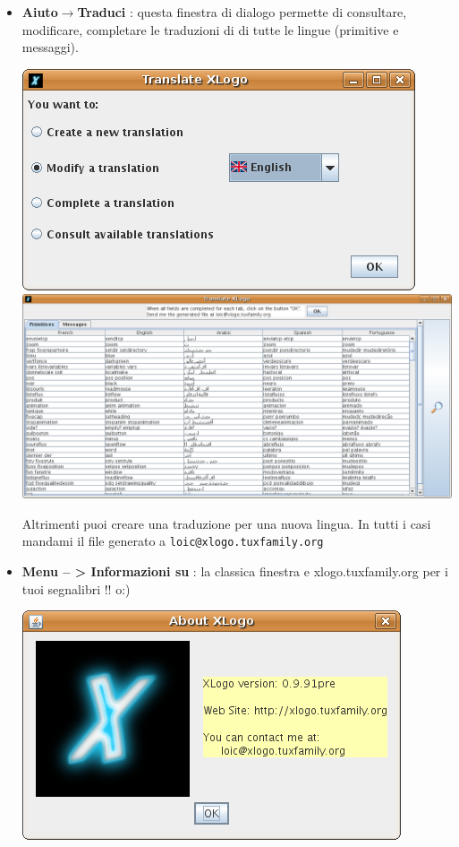 \begin{itemize}
		\item \textbf{Aiuto$\to$Traduci \xlogo}: questa finestra di dialogo permette di consultare, modificare, completare le traduzioni di \xlogo di tutte le lingue (primitive e messaggi).
		\begin{center}
			\includegraphics[scale=0.4]{pics/interface-CaptureXLogoTranslate1.png}
			\includegraphics[scale=0.4]{pics/interface-CaptureXLogoTranslate2.png}
		\end{center}
		\vspace{0.25cm}
		Altrimenti puoi creare una traduzione per una nuova lingua. In tutti i casi mandami il file generato a \texttt{loic@xlogo.tuxfamily.org}
		\item \textbf{Menu -- > Informazioni su \xlogo}: la classica finestra e xlogo.tuxfamily.org per i tuoi segnalibri !! o:) 
		\begin{center}
			\includegraphics[scale=0.6]{pics/interface-CaptureAbout.png}
		\end{center}
		\vspace{0.25cm}
	\end{itemize}
